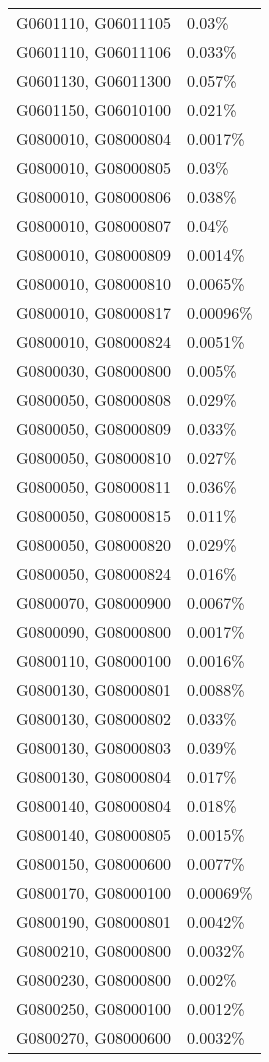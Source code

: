 \begin{longtable}[]{@{}ll@{}}
G0601110, G06011105 & 0.03\% \\
G0601110, G06011106 & 0.033\% \\
G0601130, G06011300 & 0.057\% \\
G0601150, G06010100 & 0.021\% \\
G0800010, G08000804 & 0.0017\% \\
G0800010, G08000805 & 0.03\% \\
G0800010, G08000806 & 0.038\% \\
G0800010, G08000807 & 0.04\% \\
G0800010, G08000809 & 0.0014\% \\
G0800010, G08000810 & 0.0065\% \\
G0800010, G08000817 & 0.00096\% \\
G0800010, G08000824 & 0.0051\% \\
G0800030, G08000800 & 0.005\% \\
G0800050, G08000808 & 0.029\% \\
G0800050, G08000809 & 0.033\% \\
G0800050, G08000810 & 0.027\% \\
G0800050, G08000811 & 0.036\% \\
G0800050, G08000815 & 0.011\% \\
G0800050, G08000820 & 0.029\% \\
G0800050, G08000824 & 0.016\% \\
G0800070, G08000900 & 0.0067\% \\
G0800090, G08000800 & 0.0017\% \\
G0800110, G08000100 & 0.0016\% \\
G0800130, G08000801 & 0.0088\% \\
G0800130, G08000802 & 0.033\% \\
G0800130, G08000803 & 0.039\% \\
G0800130, G08000804 & 0.017\% \\
G0800140, G08000804 & 0.018\% \\
G0800140, G08000805 & 0.0015\% \\
G0800150, G08000600 & 0.0077\% \\
G0800170, G08000100 & 0.00069\% \\
G0800190, G08000801 & 0.0042\% \\
G0800210, G08000800 & 0.0032\% \\
G0800230, G08000800 & 0.002\% \\
G0800250, G08000100 & 0.0012\% \\
G0800270, G08000600 & 0.0032\% \\

\end{longtable}
